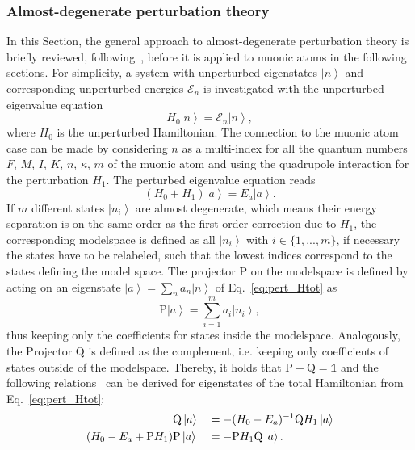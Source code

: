 \subsubsection{Almost-degenerate perturbation theory}
\label{sec:almostDeg}
In this Section, the general approach to almost-degenerate perturbation theory is briefly reviewed, following~\cite{BorieRinker1982,sakurai1994}, before it is applied to muonic atoms in the following sections. For simplicity, a system with unperturbed eigenstates $\left|n\right>$ and corresponding unperturbed energies $\mathcal{E}_n$ is investigated with the unperturbed eigenvalue equation
\begin{equation}
H_0 \left|n\right> = \mathcal{E}_n \left|n\right>,
\end{equation}
where $H_0$ is the unperturbed Hamiltonian.
The connection to the muonic atom case can be made by considering $n$ as a multi-index for all the quantum numbers $F,\,M,\,I,\,K,\,n,\,\kappa,\,m$ of the muonic atom and using the quadrupole interaction for the perturbation $H_1$. The perturbed eigenvalue equation reads
\begin{equation}
\label{eq:pert_Htot}
\left(H_0 + H_1\right) \left|a\right> = E_a \left|a\right>.
\end{equation}
If $m$ different states $\left| n_i \right>$ are almost degenerate, which means their energy separation is on the same order as the first order correction due to $H_1$, the corresponding modelspace is defined as all $\left| n_i \right>$ with $i\in \{1,...,m\}$, if necessary the states have to be relabeled, such that the lowest indices correspond to the states defining the model space. The projector $\text{P}$ on the modelspace is defined by acting on an eigenstate $\left|a\right> = \sum_n a_n \left|n\right>$ of Eq.~\eqref{eq:pert_Htot} as
\begin{equation}
\text{P}\left|a\right> = \sum_{i=1}^m a_i \left|n_i\right>,
\end{equation}
thus keeping only the coefficients for states inside the modelspace. Analogously, the Projector $\text{Q}$ is defined as the complement, i.e. keeping only coefficients of states outside of the modelspace. Thereby, it holds that $\text{P}+\text{Q}=\mathbb{1}$ and the following relations~\cite{BorieRinker1982} can be derived for eigenstates of the total Hamiltonian from Eq.~\eqref{eq:pert_Htot}:
\begin{alignat}{2}
&\text{Q}\left|a\right> &&= - (H_0-E_a)^{-1}\text{Q}H_1 \left|a\right>\notag\\
 (H_0-E_a+\text{P}H_1)&\text{P}\left|a\right>&&= -\text{P}H_1\text{Q}\left|a\right>.
\end{alignat}
